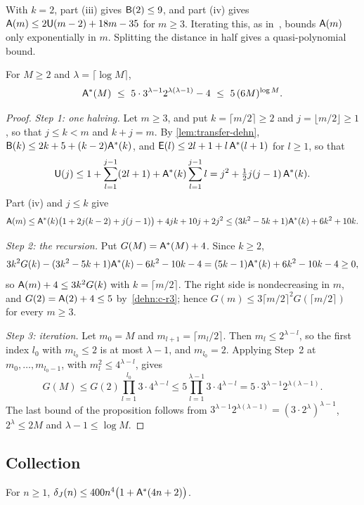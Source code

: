 With $k=2$, part (iii) gives $\mathsf B(2)\le9$, and part (iv) gives $\mathsf A(m)\le2\mathsf U(m-2)+18m-35$ for $m\ge3$. Iterating this, as
in~\cite{Lee12}, bounds $\mathsf A(m)$ only exponentially in $m$. Splitting the distance in half gives a quasi-polynomial bound.

\begin{proposition}\label{prop:far-qp}
For $M\ge2$ and $\lambda=\lceil\log M\rceil$,
\[
\dehnA^*(M)\ \le\ 5\cdot3^{\lambda-1}2^{\lambda(\lambda-1)}-4\ \le\ 5\,(6M)^{\log M}.
\]
\end{proposition}

\begin{proof}
\emph{Step 1: one halving.} Let $m\ge3$, and put $k=\lceil m/2\rceil\ge2$ and $j=\lfloor m/2\rfloor\ge1$, so that $j\le k<m$ and $k+j=m$. By
\cref{lem:transfer-dehn}, $\mathsf B(k)\le2k+5+(k-2)\mathsf A^*(k)$, and $\mathsf E(l)\le2l+1+l\,\mathsf A^*(l+1)$ for $l\ge1$, so that
\[
\mathsf U(j)\le1+\sum_{l=1}^{j-1}(2l+1)+\mathsf A^*(k)\sum_{l=1}^{j-1}l= j^2+\tfrac12j(j-1)\,\mathsf A^*(k).
\]
Part (iv) and $j\le k$ give
\[
\mathsf A(m)\le\mathsf A^*(k)\bigl(1+2j(k-2)+j(j-1)\bigr)+4jk+10j+2j^2\le(3k^2-5k+1)\mathsf A^*(k)+6k^2+10k .
\]

\emph{Step 2: the recursion.} Put $G(M)=\mathsf A^*(M)+4$. Since $k\ge2$,
\[
3k^2G(k)-(3k^2-5k+1)\mathsf A^*(k)-6k^2-10k-4=(5k-1)\mathsf A^*(k)+6k^2-10k-4\ge0,
\]
so $\mathsf A(m)+4\le3k^2G(k)$ with $k=\lceil m/2\rceil$. The right side is nondecreasing in $m$, and $G(2)=\mathsf A(2)+4\le5$
by~\ref{dehn:c-r3}; hence $G(m)\le3\lceil m/2\rceil^2G(\lceil m/2\rceil)$ for every $m\ge3$.

\emph{Step 3: iteration.} Let $m_0=M$ and $m_{l+1}=\lceil m_l/2\rceil$. Then $m_l\le2^{\lambda-l}$, so the first index $l_0$ with $m_{l_0}\le2$ is
at most $\lambda-1$, and $m_{l_0}=2$. Applying Step~2 at $m_0,\dots,m_{l_0-1}$, with $m_l^2\le4^{\lambda-l}$, gives
\[
G(M)\le G(2)\prod_{l=1}^{l_0}3\cdot4^{\lambda-l}\le5\prod_{l=1}^{\lambda-1}3\cdot4^{\lambda-l}=5\cdot3^{\lambda-1}2^{\lambda(\lambda-1)} .
\]
The last bound of the proposition follows from $3^{\lambda-1}2^{\lambda(\lambda-1)}=(3\cdot2^\lambda)^{\lambda-1}$, $2^\lambda\le2M$ and
$\lambda-1\le\log M$.
\end{proof}

\subsection{Collection}\label{dehn:sec-collection}

\begin{proposition}[Collection]\label{prop:collection}
For $n\ge1$, $\delta_J(n)\le400n^4\bigl(1+\mathsf A^*(4n+2)\bigr)$.
\end{proposition}

